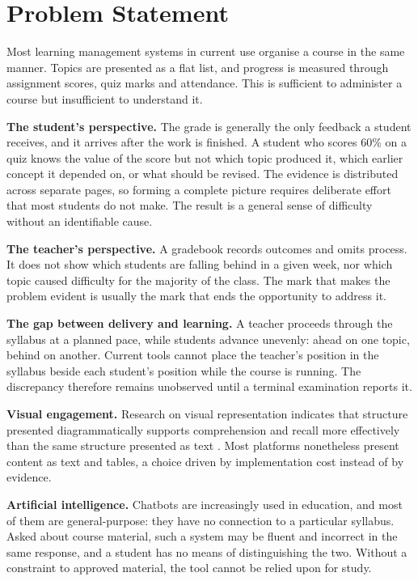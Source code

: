\chapter{Problem Statement}

Most learning management systems in current use organise a course in the same manner. Topics are presented as a flat list, and progress is measured through assignment scores, quiz marks and attendance. This is sufficient to administer a course but insufficient to understand it.

\textbf{The student's perspective.} The grade is generally the only feedback a student receives, and it arrives after the work is finished. A student who scores 60\% on a quiz knows the value of the score but not which topic produced it, which earlier concept it depended on, or what should be revised. The evidence is distributed across separate pages, so forming a complete picture requires deliberate effort that most students do not make. The result is a general sense of difficulty without an identifiable cause.

\textbf{The teacher's perspective.} A gradebook records outcomes and omits process. It does not show which students are falling behind in a given week, nor which topic caused difficulty for the majority of the class. The mark that makes the problem evident is usually the mark that ends the opportunity to address it.

\textbf{The gap between delivery and learning.} A teacher proceeds through the syllabus at a planned pace, while students advance unevenly: ahead on one topic, behind on another. Current tools cannot place the teacher's position in the syllabus beside each student's position while the course is running. The discrepancy therefore remains unobserved until a terminal examination reports it.

\textbf{Visual engagement.} Research on visual representation indicates that structure presented diagrammatically supports comprehension and recall more effectively than the same structure presented as text \cite{eppler2006comparison}. Most platforms nonetheless present content as text and tables, a choice driven by implementation cost instead of by evidence.

\textbf{Artificial intelligence.} Chatbots are increasingly used in education, and most of them are general-purpose: they have no connection to a particular syllabus. Asked about course material, such a system may be fluent and incorrect in the same response, and a student has no means of distinguishing the two. Without a constraint to approved material, the tool cannot be relied upon for study.

